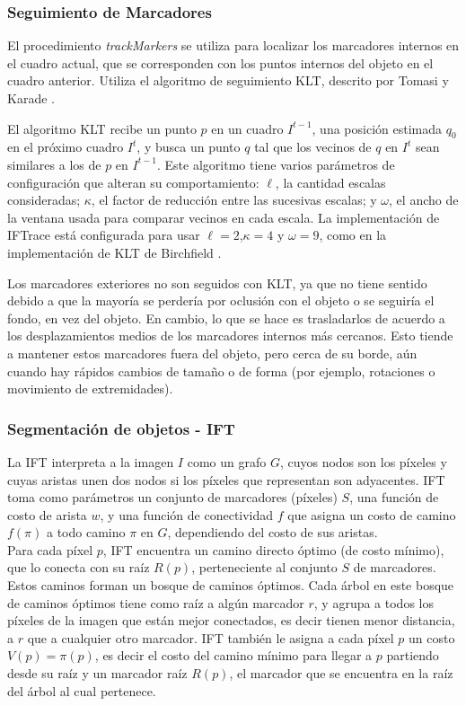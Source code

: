 \documentclass[a4paper,10pt]{article}
\begin{document}
\subsubsection{Seguimiento de Marcadores}

El procedimiento \textit{trackMarkers} se utiliza para localizar los marcadores
internos en el cuadro actual, que se corresponden con los puntos internos del objeto
en el cuadro anterior. Utiliza el algoritmo de seguimiento KLT, descrito por Tomasi y
Karade \cite{Tomasi91detectionand}.

El algoritmo KLT recibe un punto $p$ en un cuadro $I^{t-1}$, una posición estimada
$q_{0}$ en el próximo cuadro $I^{t}$, y busca un punto $q$ tal que los vecinos
de $q$ en $I^{t}$ sean similares a los de $p$ en $I^{t-1}$. Este algoritmo tiene
varios parámetros de configuración que alteran su comportamiento: $\ell$, la cantidad
escalas consideradas; $\kappa$, el factor de reducción entre las sucesivas escalas; y
$\omega$, el ancho de la ventana usada para comparar vecinos en cada escala.
La implementación de IFTrace está configurada para usar $\ell=2$,$\kappa=4$ y
$\omega=9$, como en la implementación de KLT de Birchfield \cite{Birchfield-KLT-implementation}.

Los marcadores exteriores no son seguidos con KLT, ya que no tiene sentido debido
a que la mayoría se perdería por oclusión con el objeto o se seguiría el fondo, en
vez del objeto. En cambio, lo que se hace es trasladarlos de acuerdo a los
desplazamientos medios de los marcadores internos más cercanos. Esto tiende
a mantener estos marcadores fuera del objeto, pero cerca de su borde, aún cuando
hay rápidos cambios de tamaño o de forma (por ejemplo, rotaciones o movimiento de extremidades).

\subsubsection{Segmentación de objetos - IFT}

La IFT interpreta a la imagen $I$ como un grafo $G$, cuyos nodos son los píxeles y cuyas
aristas unen dos nodos si los píxeles que representan son adyacentes. IFT toma como parámetros un conjunto de
marcadores (píxeles) $S$, una función de costo de arista $w$, y una función de
conectividad $f$ que asigna un costo de camino $f(\pi)$ a todo camino $\pi$ en $G$,
dependiendo del costo de sus aristas.\\
Para cada píxel $p$, IFT encuentra un camino directo óptimo (de costo mínimo), que lo
conecta con su raíz $R(p)$, perteneciente al conjunto $S$ de marcadores. Estos caminos forman un bosque de caminos
óptimos. Cada árbol en este bosque de caminos óptimos
tiene como raíz a algún marcador $r$, y agrupa a todos los píxeles de la imagen que
están mejor conectados, es decir tienen menor distancia, a $r$ que a cualquier otro marcador.
IFT también le asigna a
cada píxel $p$ un costo $V(p) = \pi(p)$, es decir el costo del camino mínimo para llegar a $p$ partiendo desde su raíz
y un marcador raíz $R(p)$, el marcador
que se encuentra en la raíz del árbol al cual pertenece.
\end{document}
